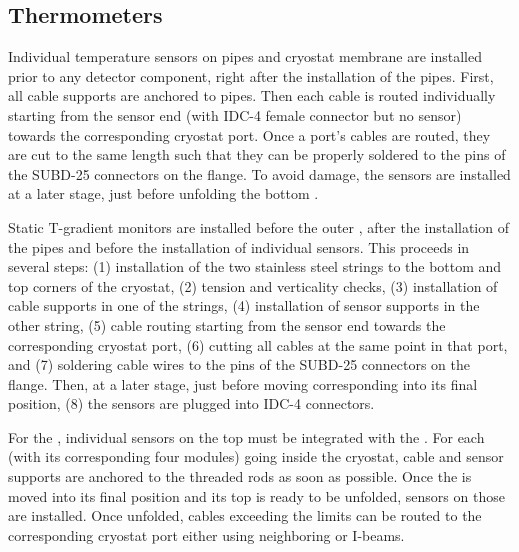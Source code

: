 \subsection{Thermometers}
\label{sec:fdgen-slow-cryo-instal-th}


Individual temperature sensors on pipes and cryostat membrane are installed prior to any detector component, right after the installation of the pipes.
First, all cable supports are anchored to pipes. Then each cable is routed individually starting from the sensor end (with IDC-4 female connector but no sensor)
towards the corresponding cryostat port. Once a port's cables are routed, %
they are cut to the same length such that they can be properly soldered
to the pins of the SUBD-25 connectors on the flange. 
To avoid damage, the sensors are installed at a later stage, just before unfolding the bottom .

Static T-gradient monitors are installed before the outer , %
after the installation of the pipes
and before the installation of individual sensors. This proceeds in several steps: (1) installation of the two stainless steel strings to the bottom and top corners of the cryostat,
(2) tension and verticality checks, (3) installation of cable supports in one of the strings, (4) installation of sensor supports in the other string, (5) cable routing starting from
the sensor end towards the corresponding cryostat port, (6) cutting all cables at the same point in that port, and (7) soldering cable wires to the pins of the SUBD-25 connectors on the flange. Then, at a later stage, just before moving corresponding  into its final position, (8) the sensors are plugged into IDC-4 connectors. 

For the \single{}, individual sensors on the top  must be integrated with the . For each  (with its corresponding four  modules)
going inside the cryostat, cable and sensor supports are anchored to the  threaded rods as soon as possible.
Once the  is moved into its final position and its top  is ready to be unfolded, sensors on those  are installed. Once unfolded, cables 
exceeding the  limits can be routed to the corresponding cryostat port either using neighboring  or  I-beams. 

